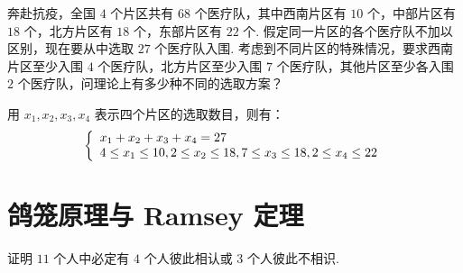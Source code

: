 \documentclass[cn, hazy, blue, normal, 12pt]{elegantnote}
\begin{document}
\begin{exercise}

    奔赴抗疫，全国 $4$ 个片区共有 $68$ 个医疗队，其中西南片区有 $10$ 个，中部片区有 $18$ 个，北方片区有 $18$ 个，东部片区有 $22$ 个. 假定同一片区的各个医疗队不加以区别，现在要从中选取 $27$ 个医疗队入围. 考虑到不同片区的特殊情况，要求西南片区至少入围 $4$ 个医疗队，北方片区至少入围 $7$ 个医疗队，其他片区至少各入围 $2$ 个医疗队，问理论上有多少种不同的选取方案？

\end{exercise}

\begin{solution}[print=true]

    用 $x_{1}, x_{2}, x_{3}, x_{4}$ 表示四个片区的选取数目，则有：
    \begin{equation}
        \notag
        \left\{\begin{array}{l}
            x_{1}+x_{2}+x_{3}+x_{4}=27 \\
            4 \leq x_1 \leq 10, 2 \leq x_2 \leq 18, 7 \leq x_3 \leq 18, 2 \leq x_4 \leq 22
        \end{array}\right.
    \end{equation}

\end{solution}


\section{鸽笼原理与 Ramsey 定理}

\begin{exercise}

    证明 $11$ 个人中必定有 $4$ 个人彼此相认或 $3$ 个人彼此不相识.

\end{exercise}
\end{document}
